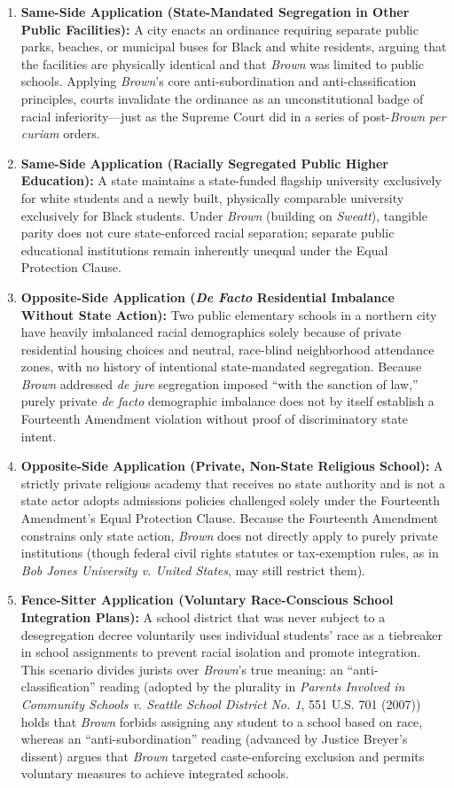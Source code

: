 \documentclass[12pt]{article}
\begin{document}
\begin{enumerate}
  \item \textbf{Same-Side Application (State-Mandated Segregation in Other Public Facilities):} A city enacts an ordinance requiring separate public parks, beaches, or municipal buses for Black and white residents, arguing that the facilities are physically identical and that \textit{Brown} was limited to public schools. Applying \textit{Brown}'s core anti-subordination and anti-classification principles, courts invalidate the ordinance as an unconstitutional badge of racial inferiority---just as the Supreme Court did in a series of post-\textit{Brown} \textit{per curiam} orders.
  \item \textbf{Same-Side Application (Racially Segregated Public Higher Education):} A state maintains a state-funded flagship university exclusively for white students and a newly built, physically comparable university exclusively for Black students. Under \textit{Brown} (building on \textit{Sweatt}), tangible parity does not cure state-enforced racial separation; separate public educational institutions remain inherently unequal under the Equal Protection Clause.
  \item \textbf{Opposite-Side Application (\textit{De Facto} Residential Imbalance Without State Action):} Two public elementary schools in a northern city have heavily imbalanced racial demographics solely because of private residential housing choices and neutral, race-blind neighborhood attendance zones, with no history of intentional state-mandated segregation. Because \textit{Brown} addressed \textit{de jure} segregation imposed ``with the sanction of law,'' purely private \textit{de facto} demographic imbalance does not by itself establish a Fourteenth Amendment violation without proof of discriminatory state intent.
  \item \textbf{Opposite-Side Application (Private, Non-State Religious School):} A strictly private religious academy that receives no state authority and is not a state actor adopts admissions policies challenged solely under the Fourteenth Amendment's Equal Protection Clause. Because the Fourteenth Amendment constrains only state action, \textit{Brown} does not directly apply to purely private institutions (though federal civil rights statutes or tax-exemption rules, as in \textit{Bob Jones University v. United States}, may still restrict them).
  \item \textbf{Fence-Sitter Application (Voluntary Race-Conscious School Integration Plans):} A school district that was never subject to a desegregation decree voluntarily uses individual students' race as a tiebreaker in school assignments to prevent racial isolation and promote integration. This scenario divides jurists over \textit{Brown}'s true meaning: an ``anti-classification'' reading (adopted by the plurality in \textit{Parents Involved in Community Schools v. Seattle School District No. 1}, 551 U.S. 701 (2007)) holds that \textit{Brown} forbids assigning any student to a school based on race, whereas an ``anti-subordination'' reading (advanced by Justice Breyer's dissent) argues that \textit{Brown} targeted caste-enforcing exclusion and permits voluntary measures to achieve integrated schools.

\end{enumerate}
\end{document}
